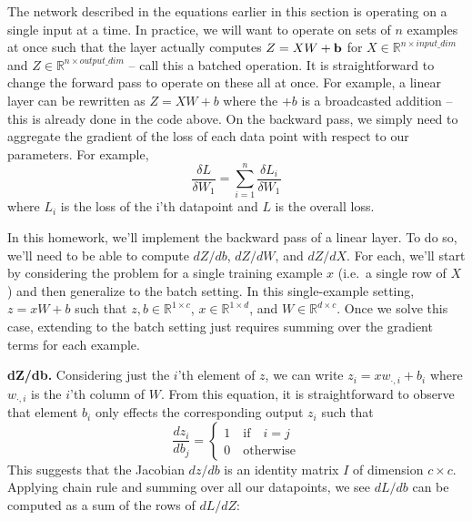 \documentclass[a4paper,10pt]{article}
\begin{document}
 The network described in the equations earlier in this section is operating on a single input at a time. In practice, we will want to operate on sets of $n$ examples at once such that the layer actually computes $Z = XW+\mathbf{b}$ for $X \in \mathbb{R}^{n \times input\_dim}$ and $Z \in \mathbb{R}^{n \times output\_dim}$ -- call this a batched operation. It is straightforward to change the forward pass to operate on these all at once. For example, a linear layer can be rewritten as $Z=XW+b$ where the $+b$ is a broadcasted addition -- this is already done in the code above. On the backward pass, we simply need to aggregate the gradient of the loss of each data point with respect to our parameters. For example,
%
\begin{equation}
\frac{\delta L}{\delta W_1} = \sum_{i=1}^n   \frac{\delta L_i}{\delta W_1} 
\end{equation}
%
where $L_i$ is the loss of the i'th datapoint and $L$ is the overall loss.

 In this homework, we'll implement the backward pass of a linear layer. To do so, we'll need to be able to compute $dZ/db$, $dZ/dW$, and $dZ/dX$. For each, we'll start by considering the problem for a single training example $x$ (i.e.~a single row of $X$) and then generalize to the batch setting. In this single-example setting, $z=xW+b$ such that $z, b\in\mathbb{R}^{1\times c}$, $x \in \mathbb{R}^{1\times d}$, and $W \in \mathbb{R}^{d\times c}$. Once we solve this case, extending to the batch setting just requires summing over the gradient terms for each example.

\vspace{10pt}\noindent\textbf{dZ/db.} Considering just the $i$'th element of $z$, we can write $z_i = xw_{\cdot, i}+b_i$ where $w_{\cdot,i}$ is the $i$'th column of $W$. From this equation, it is straightforward to observe that element $b_i$ only effects the corresponding output $z_i$ such that
%
\begin{equation}
    \frac{dz_i}{db_j}= \begin{cases}
    1 \quad\mbox{if}\quad i=j\\
    0 \quad\mbox{otherwise}
    \end{cases}
\end{equation}
%
This suggests that the Jacobian $dz/db$ is an identity matrix $I$ of dimension $c \times c$. Applying chain rule and summing over all our datapoints, we see $dL/db$ can be computed as a sum of the rows of $dL/dZ$:
\end{document}
